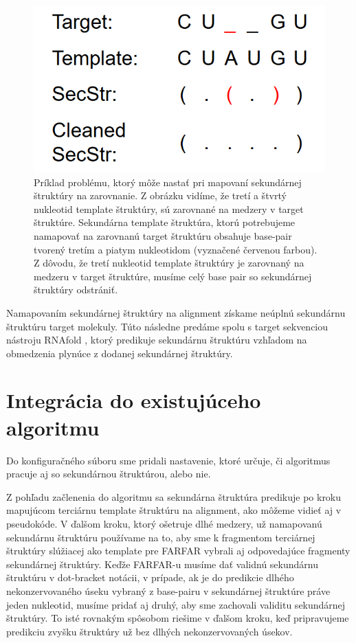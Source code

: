 \begin{figure}%
\includegraphics[width=\textwidth]{../img/cleanStr}
\caption{Príklad problému, ktorý môže nastať pri mapovaní sekundárnej štruktúry na zarovnanie. Z obrázku vidíme, že tretí a štvrtý nukleotid template štruktúry, sú zarovnané na medzery v target štruktúre. Sekundárna template štruktúra, ktorú potrebujeme namapovať na zarovnanú target štruktúru obsahuje base-pair tvorený tretím a piatym nukleotidom (vyznačené červenou farbou).  Z dôvodu, že tretí nukleotid template štruktúry je zarovnaný na medzeru v target štruktúre, musíme celý base pair so sekundárnej štruktúry odstrániť.}
\label{obr5.0}
\end{figure}


\indent Namapovaním sekundárnej štruktúry na alignment získame neúplnú sekundárnu štruktúru target molekuly. Túto následne predáme spolu s target sekvenciou nástroju RNAfold \cite{RNAfold}, ktorý predikuje sekundárnu štruktúru vzhľadom na obmedzenia plynúce z dodanej sekundárnej štruktúry. 


\section{Integrácia do existujúceho algoritmu}
Do konfiguračného súboru sme pridali nastavenie, ktoré určuje, či algoritmus pracuje aj so sekundárnou štruktúrou, alebo nie.


\indent Z pohľadu začlenenia do algoritmu sa sekundárna štruktúra predikuje po kroku mapujúcom terciárnu template štruktúru na alignment, ako môžeme vidieť aj v pseudokóde. V ďalšom kroku, ktorý ošetruje dlhé medzery, už namapovanú sekundárnu štruktúru používame na to, aby sme k fragmentom terciárnej štruktúry slúžiacej ako template pre FARFAR vybrali aj odpovedajúce fragmenty sekundárnej štruktúry. Keďže FARFAR-u musíme dať validnú sekundárnu štruktúru v dot-bracket notácii, v prípade, ak je do predikcie dlhého nekonzervovaného úseku vybraný z base-pairu v sekundárnej štruktúre práve jeden nukleotid, musíme pridať aj druhý, aby sme zachovali validitu sekundárnej štruktúry. To isté rovnakým spôsobom riešime v ďalšom kroku, keď pripravujeme predikciu zvyšku štruktúry už bez dlhých nekonzervovaných úsekov. 


